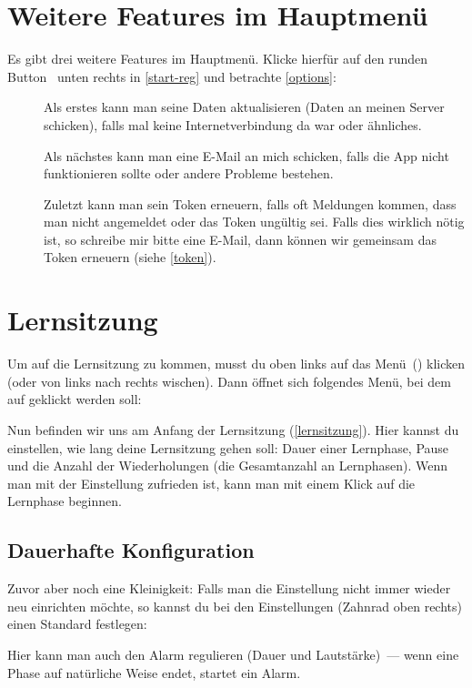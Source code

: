 \documentclass[ngerman]{tutorial}
\begin{document}
\section{Weitere Features im Hauptmenü}
Es gibt drei weitere Features im Hauptmenü. Klicke hierfür auf den runden Button~ unten rechts in \autoref{start-reg} und betrachte \autoref{options}:
\begin{description}
    \item[] Als erstes kann man seine Daten aktualisieren (Daten an meinen Server schicken), falls mal keine Internetverbindung da war oder ähnliches.
    \item[] Als nächstes kann man eine E-Mail an mich schicken, falls die App nicht funktionieren sollte oder andere Probleme bestehen.
    \item[] Zuletzt kann man sein Token erneuern, falls oft Meldungen kommen, dass man nicht angemeldet oder das Token ungültig sei.
    Falls dies wirklich nötig ist, so schreibe mir bitte eine E-Mail, dann können wir gemeinsam das Token erneuern (siehe \autoref{token}).
\end{description}

\clearpage
{}
\section{Lernsitzung}
Um auf die Lernsitzung zu kommen, musst du oben links auf das Menü~(\faNavicon) klicken (oder von links nach rechts wischen). Dann öffnet sich folgendes Menü, bei dem auf  geklickt werden soll:
\begin{center}
    \quad{}\quad{}
\end{center}

Nun befinden wir uns am Anfang der Lernsitzung (\autoref{lernsitzung}).
Hier kannst du einstellen, wie lang deine Lernsitzung gehen soll: Dauer einer Lernphase, Pause und die Anzahl der Wiederholungen (die Gesamtanzahl an Lernphasen). Wenn man mit der Einstellung zufrieden ist, kann man mit einem Klick auf  die Lernphase beginnen.

\subsection{Dauerhafte Konfiguration}
Zuvor aber noch eine Kleinigkeit: Falls man die Einstellung nicht immer wieder neu einrichten möchte, so kannst du bei den Einstellungen (Zahnrad oben rechts) einen Standard festlegen:
\begin{center}
    \qquad{}
\end{center}
Hier kann man auch den Alarm regulieren (Dauer und Lautstärke)~--- wenn eine Phase auf natürliche Weise endet, startet ein Alarm.
\end{document}
